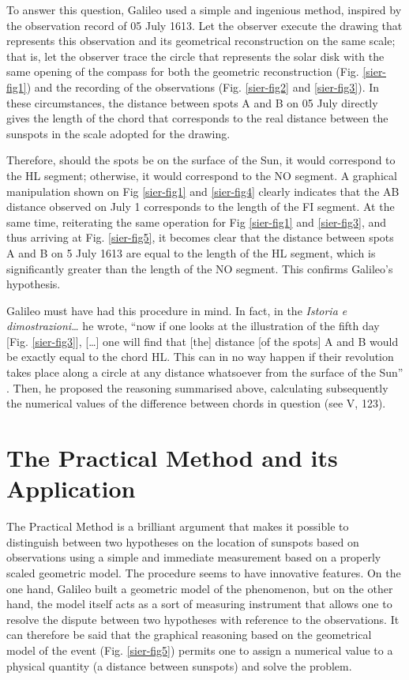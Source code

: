 \begin{artengenv}
To answer this question, Galileo used a simple and ingenious method, inspired by the observation record of 05 July 1613.
Let the observer execute the drawing that represents this observation and its geometrical reconstruction on the same
scale; that is, let the observer trace the circle that represents the solar disk with the same opening of the compass
for both the geometric reconstruction (Fig. \ref{sier-fig1}) and the recording of the observations (Fig. \ref{sier-fig2} and \ref{sier-fig3}). In these
circumstances, the distance between spots A and B on 05 July directly gives the length of the chord that corresponds to
the real distance between the sunspots in the scale adopted for the drawing. 

Therefore, should the spots be on the surface of the Sun, it would correspond to the HL segment; otherwise, it would
correspond to the NO segment. A graphical manipulation shown on Fig \ref{sier-fig1} and \ref{sier-fig4} clearly indicates that the AB distance
observed on July 1 corresponds to the length of the FI segment. At the same time, reiterating the same operation for
Fig \ref{sier-fig1} and \ref{sier-fig3}, and thus arriving at Fig. \ref{sier-fig5}, it becomes clear that the distance between spots A and B on 5 July 1613 are
equal to the length of the HL segment, which is significantly greater than the length of the NO segment. This confirms
Galileo’s hypothesis.

Galileo must have had this procedure in mind. In fact, in the \textit{Istoria e dimostrazioni\ldots} he wrote, ``now if one
looks at the illustration of the fifth day [Fig. \ref{sier-fig3}], [\ldots] one will find that [the] distance [of the spots] A and B would
be exactly equal to the chord HL. This can in no way happen if their revolution takes place along a circle at any
distance whatsoever from the surface of the Sun''
\parencite[see  V, 122.34-36;][p.115]{galilei_sunspots_2010}.
Then, he proposed the reasoning summarised above, calculating subsequently the numerical values of the difference
between chords in question (see  V, 123).

\section{The Practical Method and its Application}

The Practical Method is a brilliant argument that makes it possible to distinguish between two hypotheses on the
location of sunspots based on observations using a simple and immediate measurement based on a properly scaled
geometric model. The procedure seems to have innovative features. On the one hand, Galileo built a geometric model of
the phenomenon, but on the other hand, the model itself acts as a sort of measuring instrument that allows one to
resolve the dispute between two hypotheses with reference to the observations. It can therefore be said that the
graphical reasoning based on the geometrical model of the event (Fig. \ref{sier-fig5}) permits one to assign a numerical value to a
physical quantity (a distance between sunspots) and solve the problem.


\end{artengenv}
